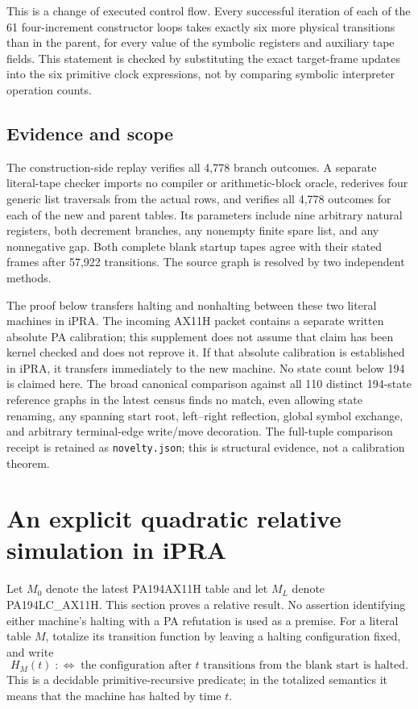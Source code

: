 This is a change of executed control flow. Every successful iteration of
each of the 61 four-increment constructor loops takes exactly six more
physical transitions than in the parent, for every value of the symbolic
registers and auxiliary tape fields. This statement is checked by
substituting the exact target-frame updates into the six primitive clock
expressions, not by comparing symbolic interpreter operation counts.

\subsection{Evidence and scope}
The construction-side replay verifies all 4,778 branch outcomes. A
separate literal-tape checker imports no compiler or arithmetic-block
oracle, rederives four generic list traversals from the actual rows,
and verifies all 4,778 outcomes for each of the new and parent tables.
Its parameters include nine arbitrary natural registers, both decrement
branches, any nonempty finite spare list, and any nonnegative gap. Both
complete blank startup tapes agree with their stated frames after 57,922
transitions. The source graph is resolved by two independent methods.

The proof below transfers halting and nonhalting between these two
literal machines in iPRA. The incoming AX11H packet contains a separate
written absolute PA calibration; this supplement does not assume that
claim has been kernel checked and does not reprove it. If that absolute
calibration is established in iPRA, it transfers immediately to the new
machine. No state count below 194 is claimed here. The broad canonical comparison
against all 110 distinct 194-state reference graphs in the latest census
finds no match, even allowing state renaming, any spanning start root,
left--right reflection, global symbol exchange, and arbitrary terminal-edge
write/move decoration. The full-tuple comparison receipt is retained as
\texttt{novelty.json}; this is structural evidence, not a calibration theorem.

\section{An explicit quadratic relative simulation in iPRA}
\label{lcax:sec:quadratic-transfer}

Let $M_0$ denote the latest PA194AX11H table and let $M_L$ denote
PA194LC\_AX11H.  This section proves a relative result.  No assertion identifying
either machine's halting with a PA refutation is used as a premise.
For a literal table $M$, totalize its transition function by leaving a
halting configuration fixed, and write
\[
 H_M(t)\;:\!\iff\;
 \text{the configuration after $t$ transitions from the blank start is halted}.
\]
This is a decidable primitive-recursive predicate; in the totalized
semantics it means that the machine has halted by time $t$.

